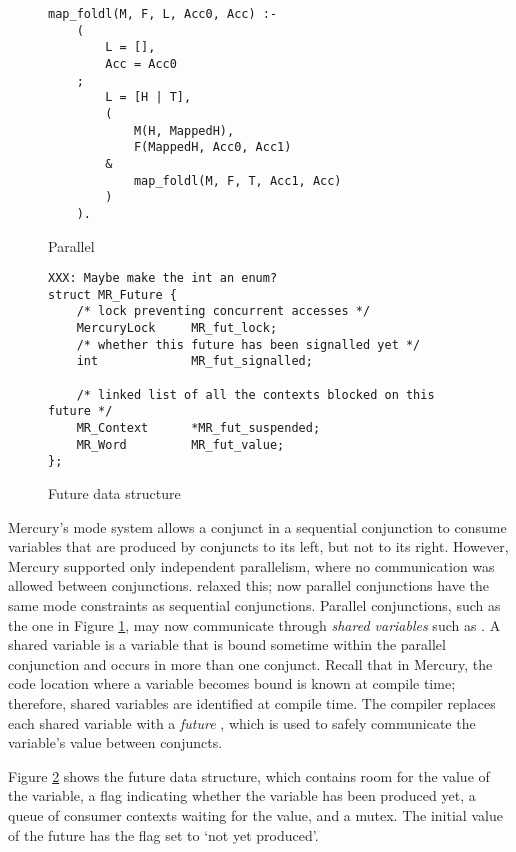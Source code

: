 

\begin{figure}
\begin{verbatim}
map_foldl(M, F, L, Acc0, Acc) :-
    (
        L = [],
        Acc = Acc0
    ;
        L = [H | T],
        (
            M(H, MappedH),
            F(MappedH, Acc0, Acc1)
        &
            map_foldl(M, F, T, Acc1, Acc)
        )
    ).
\end{verbatim}
\caption{Parallel \mapfoldl{}}
\label{fig:mapfoldl}
\end{figure}

\begin{figure}
\begin{verbatim}
XXX: Maybe make the int an enum?
struct MR_Future {
    /* lock preventing concurrent accesses */
    MercuryLock     MR_fut_lock;
    /* whether this future has been signalled yet */
    int             MR_fut_signalled;

    /* linked list of all the contexts blocked on this future */
    MR_Context      *MR_fut_suspended;
    MR_Word         MR_fut_value;
};
\end{verbatim}
\caption{Future data structure}
\label{fig:future}
\end{figure}

Mercury's mode system allows a conjunct in a sequential conjunction to consume
variables that are produced by conjuncts to its left, but not to its right.
However, Mercury supported only independent parallelism,
where no communication was allowed between conjunctions.
\citet{wang_dep_par_conj,wang_hons_thesis} relaxed this;
now parallel conjunctions have the same mode constraints as sequential
conjunctions.
Parallel conjunctions,
such as the one in Figure \ref{fig:mapfoldl},
may now
communicate through \emph{shared variables} such as .
A shared variable is a variable that is bound sometime within the parallel
conjunction and occurs in more than one conjunct.
Recall that in Mercury,
the code location where a variable becomes bound is known
at compile time;
therefore,
shared variables are identified at compile time.
The compiler replaces each shared variable with a \emph{future} \citep{multilisp},
which is used to safely communicate the variable's value between conjuncts.

Figure \ref{fig:future} shows the future data structure,
which contains room for the value of the variable,
a flag indicating whether the variable has been produced yet,
a queue of consumer contexts waiting for the value, and a mutex.
The initial value of the future has the flag set to `not yet produced'.


